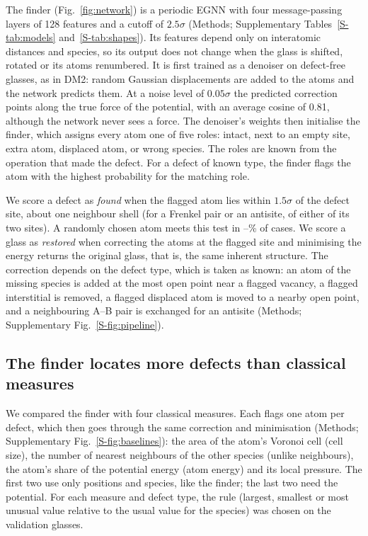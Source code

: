\documentclass[11pt]{article}
\makeatletter
\newcommand{\pd}[1]{\@ifundefined{pd@#1}{\textcolor{red}{[#1]}}{\csname pd@#1\endcsname}}
\newcommand{\suppfig}[1]{Supplementary Fig.~\ref{S-#1}}
\makeatother
\begin{document}
The finder (Fig.~\ref{fig:network}) is a periodic EGNN with four message-passing layers of 128 features and a cutoff of $2.5\sigma$ (Methods; Supplementary Tables~\ref{S-tab:models} and~\ref{S-tab:shapes}). Its features depend only on interatomic distances and species, so its output does not change when the glass is shifted, rotated or its atoms renumbered. It is first trained as a denoiser on defect-free glasses, as in DM2\citep{yang2026dm2}: random Gaussian displacements are added to the atoms and the network predicts them. At a noise level of $0.05\sigma$ the predicted correction points along the true force of the potential, with an average cosine of 0.81, although the network never sees a force. The denoiser's weights then initialise the finder, which assigns every atom one of five roles: intact, next to an empty site, extra atom, displaced atom, or wrong species. The roles are known from the operation that made the defect. For a defect of known type, the finder flags the atom with the highest probability for the matching role.

We score a defect as \emph{found} when the flagged atom lies within $1.5\sigma$ of the defect site, about one neighbour shell (for a Frenkel pair or an antisite, of either of its two sites). A randomly chosen atom meets this test in \pd{chance-min}--\pd{chance-max}\% of cases. We score a glass as \emph{restored} when correcting the atoms at the flagged site and minimising the energy returns the original glass, that is, the same inherent structure\citep{stillinger1982}. The correction depends on the defect type, which is taken as known: an atom of the missing species is added at the most open point near a flagged vacancy, a flagged interstitial is removed, a flagged displaced atom is moved to a nearby open point, and a neighbouring A--B pair is exchanged for an antisite (Methods; \suppfig{fig:pipeline}).

\subsection*{The finder locates more defects than classical measures}



We compared the finder with four classical measures. Each flags one atom per defect, which then goes through the same correction and minimisation (Methods; \suppfig{fig:baselines}): the area of the atom's Voronoi cell (cell size), the number of nearest neighbours of the other species (unlike neighbours), the atom's share of the potential energy (atom energy) and its local pressure. The first two use only positions and species, like the finder; the last two need the potential. For each measure and defect type, the rule (largest, smallest or most unusual value relative to the usual value for the species) was chosen on the validation glasses.
\end{document}
